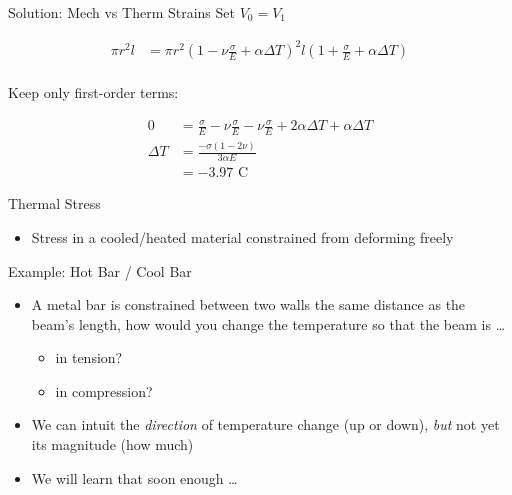 \documentclass[10pt, svgnames]{beamer}
\begin{document}
\begin{frame}[label={sec:orgc38f22f}]{Solution: Mech vs Therm Strains}
Set \(V_0 = V_{1}\)

\begin{align*}
    \pi r^{2} l &= \pi r^{2}\left(1 - \nu \frac{\sigma}{E} + \alpha \Delta T \right)^{2} l\left( 1 + \frac{\sigma}{E} + \alpha \Delta T \right) \\
\end{align*}

Keep only first-order terms:

\begin{align*}
    0 &= \frac{\sigma}{E} -\nu \frac{\sigma}{E} -\nu \frac{\sigma}{E} + 2\alpha \Delta T + \alpha \Delta T \\
    \Delta T &= \frac{-\sigma(1 - 2 \nu)}{3 \alpha E} \\
      &= -3.97 \text{ C}
\end{align*}
\end{frame}

\begin{frame}[label={sec:org9c12122}]{Thermal Stress}
\begin{itemize}
\item Stress in a cooled/heated material constrained from deforming freely
\end{itemize}
\end{frame}

\begin{frame}[label={sec:orga697cfa}]{Example: Hot Bar / Cool Bar}
\begin{itemize}
\item A metal bar is constrained between two walls the same distance as the
beam's length, how would you change the temperature so that the beam
is \ldots{}

\begin{itemize}
\item in tension?

\item in compression?
\end{itemize}

\item We can intuit the \emph{direction} of temperature change (up or down),
\emph{but} not yet its magnitude (how much)

\item We will learn that soon enough \ldots{}
\end{itemize}
\end{frame}
\end{document}
